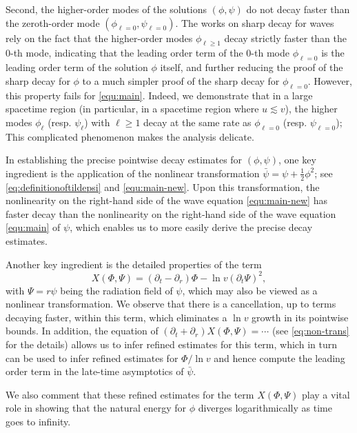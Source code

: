 \documentclass[a4paper,reqno]{amsart}
\theoremstyle{definition}
\numberwithin{equation}{section}
\begin{document}
Second, the higher-order modes of the solutions $(\phi, \psi)$ do not decay faster than the zeroth-order mode $(\phi_{\ell = 0}, \psi_{\ell=0})$. The works \cite{LuOh19,angelopoulos2021late,Hintz,MZ21PLKerr,DMMY,Millet23,LuOh} on sharp decay for waves rely on the fact that the higher-order modes $\phi_{\ell\geq 1}$ decay strictly faster than the  $0$-th mode, indicating that the leading order term of the $0$-th mode $\phi_{\ell=0}$ is the leading order term of the solution $\phi$ itself, and further reducing the proof of the sharp decay for $\phi$ to a much simpler proof of the sharp decay for $\phi_{\ell=0}$. However, this property fails for \eqref{equ:main}. Indeed, we demonstrate that in a large spacetime region (in particular, in a spacetime region where $u \lesssim v$), the higher modes $\phi_{\ell}$ (resp. $\psi_\ell$) with $\ell\geq 1$ decay at the same rate as $\phi_{\ell=0}$ (resp. $\psi_{\ell=0}$);
This complicated phenomenon makes the analysis delicate.

In establishing the precise pointwise decay estimates for $(\phi,\psi)$, one key ingredient is the application of the nonlinear transformation $\bar{\psi}=\psi+\frac{1}{2}\phi^{2}$; see \eqref{eq:definitionoftildepsi} and \eqref{equ:main-new}. Upon this transformation, the nonlinearity on the right-hand side of the wave equation \eqref{equ:main-new} has faster decay than the nonlinearity on the right-hand side of the wave equation \eqref{equ:main} of $\psi$, which enables us to more easily derive the precise decay estimates.

Another key ingredient is the detailed properties of the term 
\begin{equation*}
X(\Phi,\Psi)=(\partial_t -\partial_r)\Phi - \ln v (\partial_t \Psi)^2,
\end{equation*}
 with $\Psi=r\psi$ being the radiation field of $\psi$, which may also be viewed as a nonlinear transformation. We observe that there is a cancellation, up to terms decaying faster, within this term, which eliminates a $\ln v$ growth in its pointwise bounds. 
 In addition, the equation of $(\partial_t +\partial_r)X(\Phi,\Psi) = \cdots$ (see \eqref{eq:non-trans} for the details) allows us to infer refined estimates for this term, which in turn can be used to infer refined estimates for $\Phi/\ln v$ and hence compute the leading order term in the late-time asymptotics of $\bar{\psi}$. 
 
We also comment that these refined estimates for the term $X(\Phi,\Psi)$ play a vital role in showing that the natural energy for $\phi$ diverges logarithmically as time goes to infinity.
 
\end{document}

